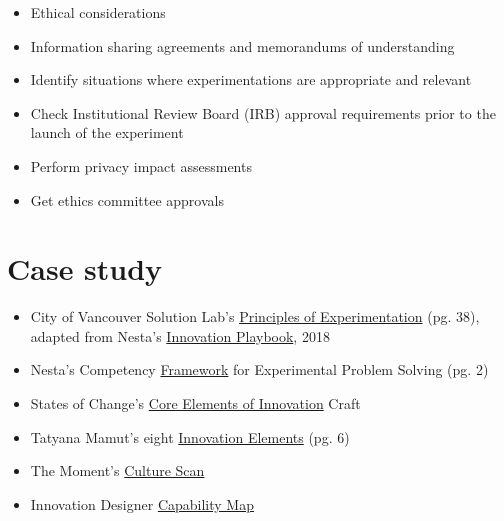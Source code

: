 \documentclass[]{book}
\providecommand{\tightlist}{%
  \setlength{\itemsep}{0pt}\setlength{\parskip}{0pt}}
\begin{document}
\begin{itemize}
\tightlist
\item
  Ethical considerations
\item
  Information sharing agreements and memorandums of understanding
\item
  Identify situations where experimentations are appropriate and relevant
\item
  Check Institutional Review Board (IRB) approval requirements prior to the launch of the experiment
\item
  Perform privacy impact assessments
\item
  Get ethics committee approvals
\end{itemize}

\hypertarget{case-study}{%
\chapter{Case study}\label{case-study}}

\begin{itemize}
\item
  City of Vancouver Solution Lab's \href{https://vancouver.ca/files/cov/navigating-complexity-solutions-lab.pdf}{Principles of Experimentation} (pg. 38), adapted from Nesta's \href{https://www.nesta.org.uk/toolkit/playbook-for-innovation-learning/}{Innovation Playbook}, 2018
\item
  Nesta's Competency \href{https://media.nesta.org.uk/documents/Nesta_CompetencyFramework_Guide_July2019.pdf}{Framework} for Experimental Problem Solving (pg. 2)
\item
  States of Change's \href{https://states-of-change.org/assets/images/StatesofChange_Curriculum_Craft.png}{Core Elements of Innovation} Craft
\item
  Tatyana Mamut's eight \href{https://gww.gov.bc.ca/sites/default/files/group/file/2019/0207/remixtatyanamamutleadingacultureofinnovationlowres.pdf}{Innovation Elements} (pg. 6)
\item
  The Moment's \href{https://info.themoment.is/innovationculture}{Culture Scan}
\item
  Innovation Designer \href{https://cdn2.hubspot.net/hubfs/3903042/themoment_InnovationDesignersCapabilityMap.pdf}{Capability Map}
\end{itemize}
\end{document}
